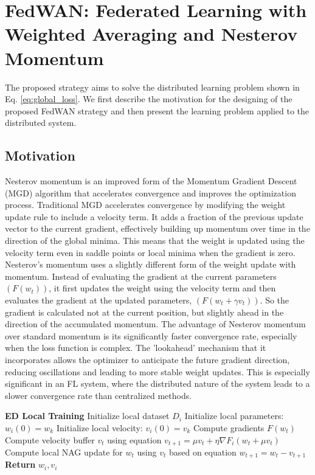 \documentclass[journal]{IEEEtran}
\begin{document}
\section{FedWAN: Federated Learning with Weighted Averaging and Nesterov Momentum}
The proposed strategy aims to solve the distributed learning problem shown in Eq. \eqref{eq:global_loss}. We first describe the motivation for the designing of the proposed FedWAN strategy and then present the learning problem applied to the distributed system.

\subsection{Motivation}
Nesterov momentum is an improved form of the Momentum Gradient Descent (MGD) algorithm that accelerates convergence and improves the optimization process. Traditional MGD accelerates convergence by modifying the weight update rule to include a velocity term. It adds a fraction of the previous update vector to the current gradient, effectively building up momentum over time in the direction of the global minima. This means that the weight is updated using the velocity term even in saddle points or local minima when the gradient is zero. Nesterov's momentum uses a slightly different form of the weight update with momentum. Instead of evaluating the gradient at the current parameters $(F(w_t))$, it first updates the weight using the velocity term and then evaluates the gradient at the updated parameters, $(F(w_t + \gamma v_t))$. So the gradient is calculated not at the current position, but slightly ahead in the direction of the accumulated momentum. The advantage of Nesterov momentum over standard momentum is its significantly faster convergence rate, especially when the loss function is complex. The 'lookahead' mechanism that it incorporates allows the optimizer to anticipate the future gradient direction, reducing oscillations and leading to more stable weight updates. This is especially significant in an FL system, where the distributed nature of the system leads to a slower convergence rate than centralized methods.

\begin{algorithm}[!t]
  \textbf{ED Local Training}\;
Initialize local dataset $D_i$\;
Initialize local parameters: $w_i(0) = w_k$\;
Initialize local velocity: $v_i(0) = v_k$\;
{
        {
            Compute gradients $F(w_t)$\;
            Compute velocity buffer $v_t$ using equation\;
            $v_{t+1} = \mu v_t + \eta \nabla F_i(w_t + \mu v_t)$\;
            Compute local NAG update for $w_t$ using $v_t$ based on equation\;
            $w_{t+1} = w_t - v_{t+1}$\;
        } 
}
\textbf{Return} $w_i, v_i$
\caption{FedWAN - Client Side}
\label{algo2}
\end{algorithm}
\end{document}
